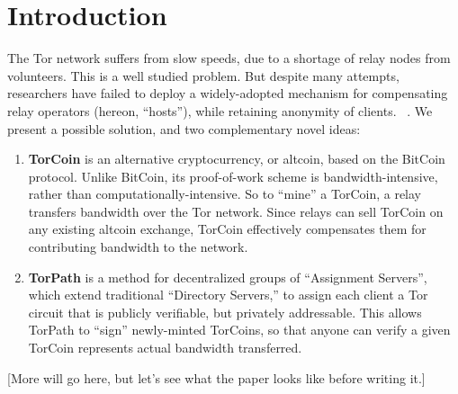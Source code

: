 \section{Introduction}

The Tor network suffers from slow speeds, due to a shortage of relay nodes from volunteers. This is a well studied problem. But despite many attempts, researchers have failed to deploy a widely-adopted mechanism for compensating relay operators (hereon, ``hosts''), while retaining anonymity of clients. ~\cite{raykova-pet2008, wpes09-xpay, incentives-fc10,
ccs10-braids, acsac11-tortoise, jansen2013lira, johnson2013onions}. We present a possible solution, and two complementary novel ideas:

\begin{enumerate}
\item \textbf{TorCoin} is an alternative cryptocurrency, or altcoin, based on the BitCoin protocol. Unlike BitCoin, its proof-of-work scheme is bandwidth-intensive, rather than computationally-intensive. So to ``mine'' a TorCoin, a relay transfers bandwidth over the Tor network. Since relays can sell TorCoin on any existing altcoin exchange, TorCoin effectively compensates them for contributing bandwidth to the network.

\item \textbf{TorPath} is a method for decentralized groups of ``Assignment Servers'', which extend traditional ``Directory Servers,'' to assign each client a Tor circuit that is publicly verifiable, but privately addressable. This allows TorPath to ``sign'' newly-minted TorCoins, so that anyone can verify a given TorCoin represents actual bandwidth transferred. 
\end{enumerate}

[More will go here, but let's see what the paper looks like before writing it.]